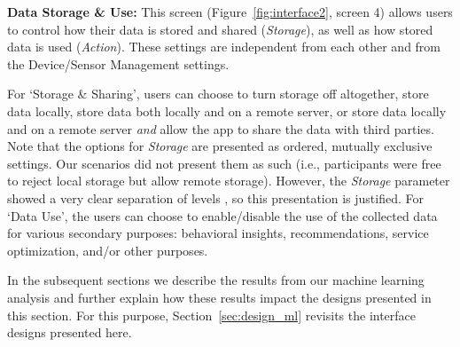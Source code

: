 

\textbf{Data Storage \& Use:} This screen (Figure~\ref{fig:interface2}, screen 4) allows users to control how their data is stored and shared (\emph{Storage}), as well as how stored data is used (\emph{Action}). These settings are independent from each other and from the Device/Sensor Management settings. 

For `Storage \& Sharing', users can choose to turn storage off altogether, store data locally, store data both locally and on a remote server, or store data locally and on a remote server \emph{and} allow the app to share the data with third parties. Note that the options for \emph{Storage} are presented as ordered, mutually exclusive settings. Our scenarios did not present them as such (i.e., participants were free to reject local storage but allow remote storage). However, the \emph{Storage} parameter showed a very clear separation of levels%
, so this presentation is justified. For `Data Use', the users can choose to enable/disable the use of the collected data for various secondary purposes: behavioral insights, recommendations, service optimization, and/or other purposes.

In the subsequent sections we describe the results from our machine learning analysis and further explain how these results impact the designs presented in this section. For this purpose, Section~\ref{sec:design_ml} revisits the interface designs presented here.

